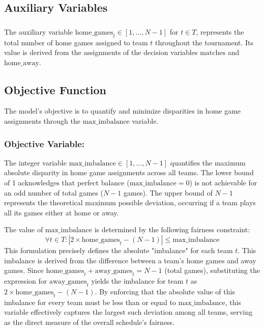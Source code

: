\documentclass{article}
\begin{document}
\subsection{Auxiliary Variables}
\subsubsection{}
The auxiliary variable $\text{home\_games}_{t} \in [1, \dots, N-1]$ for $t \in T$, represents the total number of home games assigned to team $t$ throughout the tournament. Its value is derived from the assignments of the decision variables $\text{matches}$ and $\text{home\_away}$.


\subsection{Objective Function}

The model's objective is to quantify and minimize disparities in home game assignments through the $\text{max\_imbalance}$ variable.

\subsubsection{Objective Variable: }\label{objective}
The integer variable $\text{max\_imbalance} \in [1, \dots, N-1]$ quantifies the maximum absolute disparity in home game assignments across all teams. The lower bound of 1 acknowledges that perfect balance ($\text{max\_imbalance}=0$) is not achievable for an odd number of total games ($N-1$ games). The upper bound of $N-1$ represents the theoretical maximum possible deviation, occurring if a team plays all its games either at home or away.

The value of $\text{max\_imbalance}$ is determined by the following fairness constraint:
\[ \forall t \in T : \left| 2 \times \text{home\_games}_{t} - (N-1) \right| \leq \text{max\_imbalance} \]
This formulation precisely defines the absolute "imbalance" for each team $t$. This imbalance is derived from the difference between a team's home games and away games. Since $\text{home\_games}_{t} + \text{away\_games}_{t} = N-1$ (total games), substituting the expression for $\text{away\_games}_{t}$ yields the imbalance for team $t$ as $2 \times \text{home\_games}_{t} - (N-1)$. By enforcing that the absolute value of this imbalance for every team must be less than or equal to $\text{max\_imbalance}$, this variable effectively captures the largest such deviation among all teams, serving as the direct measure of the overall schedule's fairness.
\end{document}
